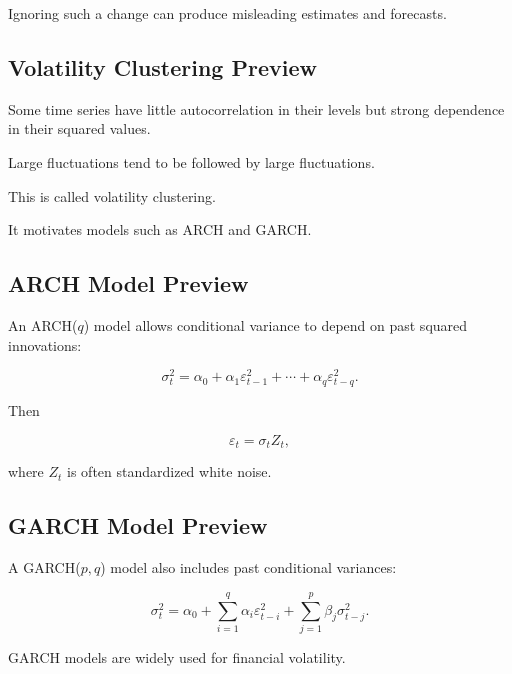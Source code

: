 Ignoring such a change can produce misleading estimates and forecasts.

\subsection{Volatility Clustering Preview}
\label{subsec:volatility-clustering}

Some time series have little autocorrelation in their levels but strong
dependence in their squared values.

Large fluctuations tend to be followed by large fluctuations.

This is called volatility clustering.

It motivates models such as ARCH and GARCH.

\subsection{ARCH Model Preview}
\label{subsec:arch-preview}

An ARCH(\(q\)) model allows conditional variance to depend on past squared
innovations:

\[
\boxed{
\sigma_t^2
=
\alpha_0
+
\alpha_1
\varepsilon_{t-1}^2
+
\cdots
+
\alpha_q
\varepsilon_{t-q}^2.
}
\]

Then

\[
\boxed{
\varepsilon_t
=
\sigma_tZ_t,
}
\]

where \(Z_t\) is often standardized white noise.

\subsection{GARCH Model Preview}
\label{subsec:garch-preview}

A GARCH(\(p,q\)) model also includes past conditional variances:

\[
\boxed{
\sigma_t^2
=
\alpha_0
+
\sum_{i=1}^{q}
\alpha_i
\varepsilon_{t-i}^2
+
\sum_{j=1}^{p}
\beta_j
\sigma_{t-j}^2.
}
\]

GARCH models are widely used for financial volatility.

